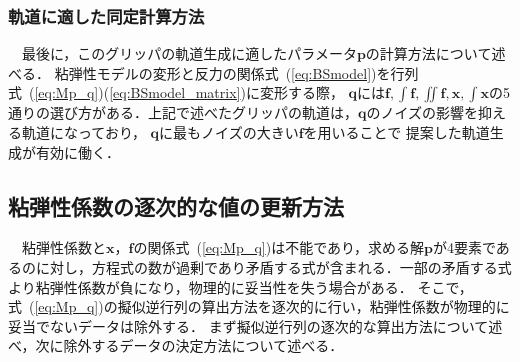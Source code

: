 \documentclass[a4paper]{jarticle}
\begin{document}
\subsubsection{軌道に適した同定計算方法}
\label{subsubsec:approproate_calculation}
　最後に，このグリッパの軌道生成に適したパラメータ$\mathbf{p}$の計算方法について述べる．
粘弾性モデルの変形と反力の関係式~(\ref{eq:BSmodel})を行列式~(\ref{eq:Mp_q})(\ref{eq:BSmodel_matrix})に変形する際，
$\mathbf{q}$には$\boldsymbol{f}, \int{\boldsymbol{f}} , \iint{\boldsymbol{f}}, \boldsymbol{x} , \int{\boldsymbol{x}}$の5通りの選び方がある．上記で述べたグリッパの軌道は，$\mathbf{q}$のノイズの影響を抑える軌道になっており，
$\mathbf{q}$に最もノイズの大きい$\boldsymbol{f}$を用いることで
提案した軌道生成が有効に働く．

\subsection{粘弾性係数の逐次的な値の更新方法}\label{subsec:downsample}
　粘弾性係数と$\boldsymbol{x}$，$\boldsymbol{f}$の関係式~(\ref{eq:Mp_q})は不能であり，求める解$\mathbf{p}$が4要素であるのに対し，方程式の数が過剰であり矛盾する式が含まれる．一部の矛盾する式より粘弾性係数が負になり，物理的に妥当性を失う場合がある．
そこで，式~(\ref{eq:Mp_q})の擬似逆行列の算出方法を逐次的に行い，粘弾性係数が物理的に妥当でないデータは除外する．
まず擬似逆行列の逐次的な算出方法について述べ，次に除外するデータの決定方法について述べる．
\end{document}

